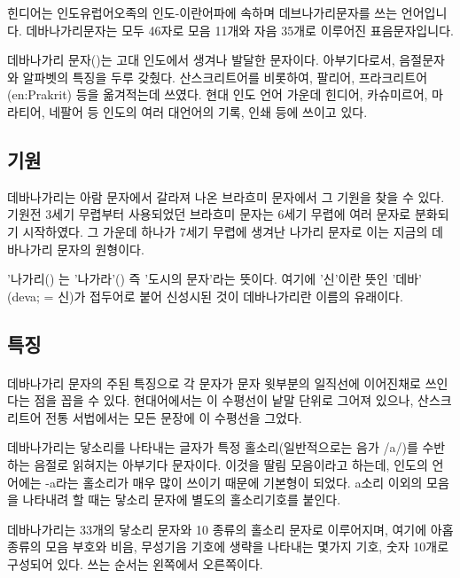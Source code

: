 \documentclass[12pt, a4paper, oneside]{book}
\begin{document}
힌디어는 인도유럽어오족의 인도-이란어파에 속하며 데브나가리문자를 쓰는 언어입니다.
데바나가리문자는 모두 46자로 모음 11개와 자음 35개로 이루어진 표음문자입니다.



데바나가리 문자()는 고대 인도에서 생겨나 발달한 문자이다. 
아부기다로서, 음절문자와 알파벳의 특징을 두루 갖췄다. 
산스크리트어를 비롯하여, 팔리어, 프라크리트어(en:Prakrit) 등을 옮겨적는데 쓰였다. 
현대 인도 언어 가운데 힌디어, 카슈미르어, 마라티어, 네팔어 등 인도의 여러 대언어의 기록, 인쇄 등에 쓰이고 있다.



\subsection{기원}
데바나가리는 아람 문자에서 갈라져 나온 브라흐미 문자에서 그 기원을 찾을 수 있다. 
기원전 3세기 무렵부터 사용되었던 브라흐미 문자는 6세기 무렵에 여러 문자로 분화되기 시작하였다. 
그 가운데 하나가 7세기 무렵에 생겨난 나가리 문자로 이는 지금의 데바나가리 문자의 원형이다.

'나가리() 는 '나가라'() 즉 '도시의 문자'라는 뜻이다. 
여기에 '신'이란 뜻인 '데바' (deva; = 신)가 접두어로 붙어 신성시된 것이 데바나가리란 이름의 유래이다.



	\subsection{특징}
	\paragraph{}

데바나가리 문자의 주된 특징으로 각 문자가 문자 윗부분의 일직선에 이어진채로 쓰인다는 점을 꼽을 수 있다. 현대어에서는 이 수평선이 낱말 단위로 그어져 있으나, 산스크리트어 전통 서법에서는 모든 문장에 이 수평선을 그었다.

데바나가리는 닿소리를 나타내는 글자가 특정 홀소리(일반적으로는 음가 /a/)를 수반하는 음절로 읽혀지는 아부기다 문자이다. 이것을 딸림 모음이라고 하는데, 인도의 언어에는 -a라는 홀소리가 매우 많이 쓰이기 때문에 기본형이 되었다. a소리 이외의 모음을 나타내려 할 때는 닿소리 문자에 별도의 홀소리기호를 붙인다.

데바나가리는 33개의 닿소리 문자와 10 종류의 홀소리 문자로 이루어지며, 여기에 아홉 종류의 모음 부호와 비음, 무성기음 기호에 생략을 나타내는 몇가지 기호, 숫자 10개로 구성되어 있다. 쓰는 순서는 왼쪽에서 오른쪽이다.
\end{document}
